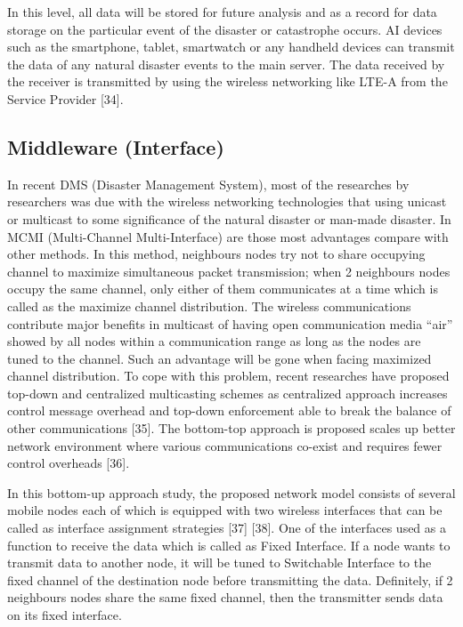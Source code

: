 \documentclass{article}
\begin{document}
In this level, all data will be stored for future analysis and as a record for data storage on the particular event of the disaster or catastrophe occurs. AI devices such as the smartphone, tablet, smartwatch or any handheld devices can transmit the data of any natural disaster events to the main server. The data received by the receiver is transmitted by using the wireless networking like LTE-A from the Service Provider [34]. 

\subsection{Middleware (Interface)}

In recent DMS (Disaster Management System), most of the researches by researchers was due with the wireless networking technologies that using unicast or multicast to some significance of the natural disaster or man-made disaster. In MCMI (Multi-Channel Multi-Interface) are those most advantages compare with other methods. In this method, neighbours nodes try not to share occupying channel to maximize simultaneous packet transmission; when 2 neighbours nodes occupy the same channel, only either of them communicates at a time which is called as the maximize channel distribution. The wireless communications contribute major benefits in multicast of having open communication media “air” showed by all nodes within a communication range as long as the nodes are tuned to the channel. Such an advantage will be gone when facing maximized channel distribution. To cope with this problem, recent researches have proposed top-down and centralized multicasting schemes as centralized approach increases control message overhead and top-down enforcement able to break the balance of other communications [35]. The bottom-top approach is proposed scales up better network environment where various communications co-exist and requires fewer control overheads [36].

In this bottom-up approach study, the proposed network model consists of several mobile nodes each of which is equipped with two wireless interfaces that can be called as interface assignment strategies [37] [38]. One of the interfaces used as a function to receive the data which is called as Fixed Interface. If a node wants to transmit data to another node, it will be tuned to Switchable Interface to the fixed channel of the destination node before transmitting the data. Definitely, if 2 neighbours nodes share the same fixed channel, then the transmitter sends data on its fixed interface.
\end{document}
